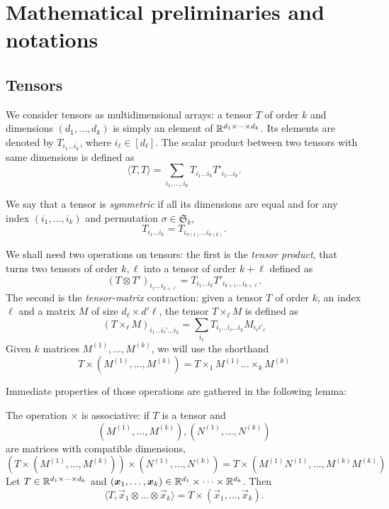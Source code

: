 \section{Mathematical preliminaries and notations}\label{2506:app:hermite-polynomials}

\subsection{Tensors}

We consider tensors as multidimensional arrays: a tensor $T$ of order $k$ and dimensions $(d_1, \dots, d_k)$ is simply an element of $\mathbb{R}^{d_1 \times \dots \times d_k}$. Its elements are denoted by $T_{i_1\dots i_k}$, where $i_\ell \in [d_\ell]$. The scalar product between two tensors with same dimensions is defined as
\[ \langle T, T \rangle = \sum_{i_1, \dots, i_k} T_{i_1\dots i_k}T'_{i_1\dots i_k}.\]

We say that a tensor is \emph{symmetric} if all its dimensions are equal and for any index $(i_1, \dots, i_k)$ and permutation $\sigma \in \mathfrak{S}_k$, 
\[ T_{i_1\dots i_k} = T_{i_{\sigma(1)}\dots i_{\sigma(k)}}. \]

We shall need two operations on tensors: the first is the \emph{tensor product}, that turns two tensors of order $k, \ell$ into a tensor of order $k + \ell$ defined as
\[ (T \otimes T')_{i_1\dots i_{k+\ell}} = T_{i_1 \dots i_k} T'_{i_{k+1} \dots i_{k+\ell}}. \]
The second is the \emph{tensor-matrix} contraction: given a tensor $T$ of order $k$, an index $\ell$ and a matrix $M$ of size $d_\ell \times d'\ell$, the tensor $T \times_\ell M$ is defined as
\[ (T \times_\ell M)_{i_1\dots i_\ell' \dots i_k} = \sum_{i_\ell} T_{i_1\dots i_\ell \dots i_k} M_{i_\ell i'_\ell } \]
Given $k$ matrices $M^{(1)}, \dots, M^{(k)}$, we will use the shorthand 
\[ T \times (M^{(1)}, \dots, M^{(k)}) = T \times_1 M^{(1)} \dots \times_k M^{(k)} \]

Immediate properties of those operations are gathered in the following lemma:
\begin{lemma}
The operation $\times$ is associative: if $T$ is a tensor and \[(M^{(1)}, \dots, M^{(k)}), (N^{(1)}, \dots, N^{(k)})\] are matrices with compatible dimensions,
    \[ \left(T \times (M^{(1)}, \dots, M^{(k)})\right) \times (N^{(1)}, \dots, N^{(k)}) = T \times (M^{(1)}N^{(1)}, \dots, M^{(k)}M^{(k)}) \]
    Let $T \in \mathbb{R}^{d_1 \times \dots \times d_k}$ and $({\boldsymbol{x}}_1, \dots, {\boldsymbol{x}}_k) \in \mathbb{R}^{d_1} \times \dots \times \mathbb{R}^{d_k}$. Then
    \[ \langle T, \vec{x}_1 \otimes \dots \otimes \vec{x}_k \rangle = T \times (\vec{x}_1, \dots, \vec{x}_k).\]
\end{lemma}

